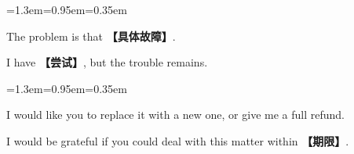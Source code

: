 \documentclass[10pt,a4paper]{ctexart}
\begin{document}
\par\vspace{1pt}
\begin{list}{}{\leftmargin=1.3em=0.95em=0.35em\itemindent=0pt\topsep=0pt\partopsep=0pt\parsep=1.5pt\itemsep=0pt}
\item[{\color{accent}\scriptsize$\blacktriangleright$}]{\footnotesize The problem is that {\color{accent}\bfseries 【具体故障】}.}\par{}
\item[{\color{accent}\scriptsize$\blacktriangleright$}]{\footnotesize I have {\color{accent}\bfseries 【尝试】}, but the trouble remains.}\par{}
\end{list}
\par\vspace{1pt}
\begin{list}{}{\leftmargin=1.3em=0.95em=0.35em\itemindent=0pt\topsep=0pt\partopsep=0pt\parsep=1.5pt\itemsep=0pt}
\item[{\color{accent}\scriptsize$\blacktriangleright$}]{\footnotesize I would like you to replace it with a new one, or give me a full refund.}\par{}
\item[{\color{accent}\scriptsize$\blacktriangleright$}]{\footnotesize I would be grateful if you could deal with this matter within {\color{accent}\bfseries 【期限】}.}\par{}
\end{list}
\par
\endgroup
\vspace{4pt}\par\nopagebreak
\end{document}
